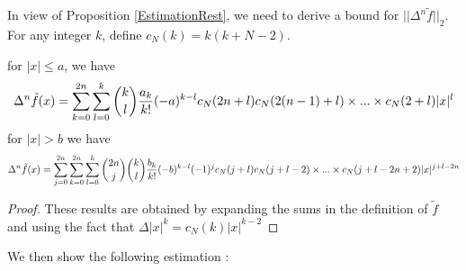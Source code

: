 \documentclass[11pt,a4paper]{article}
\begin{document}
In view of Proposition \ref{EstimationRest}, we need to derive a bound for $||\Delta^n \tilde{f}||_{2}$. For any integer $k$, define $c_N(k) = k(k+N-2)$. 
\begin{Lem} for $|x| \leq a$, we have
\[\Delta^n \tilde{f}(x) = \sum_{k=0}^{2n}\sum_{l=0}^k \dbinom{k}{l}\dfrac{a_k}{k!}(-a)^{k-l}c_N(2n+l)c_N(2(n-1)+l)\times ... \times c_N(2+l)|x|^l\]
for $|x| > b$ we have 
\[\Delta^n \tilde{f}(x) = \sum_{j=0}^{2n}\sum_{k=0}^{2n}\sum_{l=0}^k \dbinom{2n}{j}\dbinom{k}{l}\dfrac{b_k}{k!}(-b)^{k-l}(-1)^{j}c_N(j+l)c_N(j+l-2)\times ... \times c_N(j+l-2n+2)|x|^{j+l-2n}\]
\begin{proof}
These results are obtained by expanding the sums in the definition of $\tilde{f}$ and using the fact that $\Delta |x|^k = c_N(k) |x|^{k-2}$
\end{proof}
\end{Lem} 



We then show the following estimation : 
\end{document}
